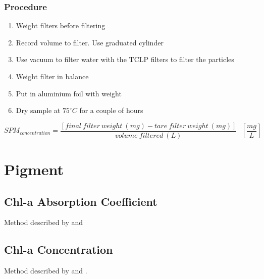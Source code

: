 \documentclass[]{spie}  %
\begin{document}
\subsubsection{{\color{red} Procedure}}
\begin{enumerate}
  \item Weight filters before filtering
  \item Record volume to filter. Use graduated cylinder
  \item Use vacuum to filter water with the TCLP filters to filter the particles
  \item Weight filter in balance
  \item Put in aluminium foil with weight
  \item Dry sample at $75^\circ C$ for a couple of hours
\end{enumerate}


\begin{equation}
SPM_{\displaystyle concentration} = \frac{[final~filter~weight~(mg) - tare~filter~weight~(mg)]}{volume~filtered~(L)}~~~\left[\frac{mg}{L}\right]
\end{equation}





\newpage
\section{Pigment}
\subsection{Chl-a Absorption Coefficient}
Method described by \cite{Mitchell2002} and \cite{Cleveland1993}
\subsection{Chl-a Concentration}

Method described by \cite{Lorenzen:1967fk} and \cite{Ritchie:2008eu}.






\newpage






\end{document}
